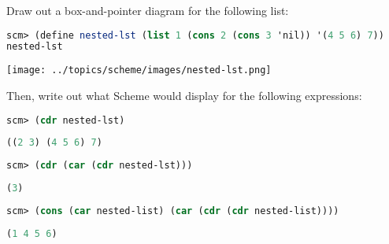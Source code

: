 \question Draw out a box-and-pointer diagram for the following list:

\begin{lstlisting}[language=Scheme]
scm> (define nested-lst (list 1 (cons 2 (cons 3 'nil)) '(4 5 6) 7))
nested-lst
\end{lstlisting}
\begin{solution}[1.25in]
\texttt{[image: ../topics/scheme/images/nested-lst.png]}
\end{solution}

Then, write out what Scheme would display for the following expressions:

\begin{lstlisting}[language=Scheme]
scm> (cdr nested-lst)
\end{lstlisting}
\begin{solution}[0.15in]
\begin{lstlisting}[language=Scheme]
((2 3) (4 5 6) 7)
\end{lstlisting}
\end{solution}

\begin{lstlisting}[language=Scheme]
scm> (cdr (car (cdr nested-lst)))
\end{lstlisting}
\begin{solution}[0.15in]
\begin{lstlisting}[language=Scheme]
(3)
\end{lstlisting}
\end{solution}

\begin{lstlisting}[language=Scheme]
scm> (cons (car nested-list) (car (cdr (cdr nested-list))))
\end{lstlisting}
\begin{solution}[0.15in]
\begin{lstlisting}[language=Scheme]
(1 4 5 6)
\end{lstlisting}
\end{solution}

